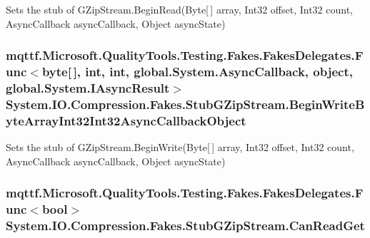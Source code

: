 Sets the stub of G\-Zip\-Stream.\-Begin\-Read(\-Byte\mbox{[}$\,$\mbox{]} array, Int32 offset, Int32 count, Async\-Callback async\-Callback, Object async\-State)

\hypertarget{class_system_1_1_i_o_1_1_compression_1_1_fakes_1_1_stub_g_zip_stream_a4df288e28ee884676cd9a2f253861824}{
\subsubsection[{Begin\-Write\-Byte\-Array\-Int32\-Int32\-Async\-Callback\-Object}]{\setlength{\rightskip}{0pt plus 5cm}mqttf.\-Microsoft.\-Quality\-Tools.\-Testing.\-Fakes.\-Fakes\-Delegates.\-Func$<$byte\mbox{[}$\,$\mbox{]}, int, int, global.\-System.\-Async\-Callback, object, global.\-System.\-I\-Async\-Result$>$ System.\-I\-O.\-Compression.\-Fakes.\-Stub\-G\-Zip\-Stream.\-Begin\-Write\-Byte\-Array\-Int32\-Int32\-Async\-Callback\-Object}}\label{class_system_1_1_i_o_1_1_compression_1_1_fakes_1_1_stub_g_zip_stream_a4df288e28ee884676cd9a2f253861824}


Sets the stub of G\-Zip\-Stream.\-Begin\-Write(\-Byte\mbox{[}$\,$\mbox{]} array, Int32 offset, Int32 count, Async\-Callback async\-Callback, Object async\-State)

\hypertarget{class_system_1_1_i_o_1_1_compression_1_1_fakes_1_1_stub_g_zip_stream_abe2b70a169b7cf1e51d30d12a7aaf62d}{
\subsubsection[{Can\-Read\-Get}]{\setlength{\rightskip}{0pt plus 5cm}mqttf.\-Microsoft.\-Quality\-Tools.\-Testing.\-Fakes.\-Fakes\-Delegates.\-Func$<$bool$>$ System.\-I\-O.\-Compression.\-Fakes.\-Stub\-G\-Zip\-Stream.\-Can\-Read\-Get}}\label{class_system_1_1_i_o_1_1_compression_1_1_fakes_1_1_stub_g_zip_stream_abe2b70a169b7cf1e51d30d12a7aaf62d}


